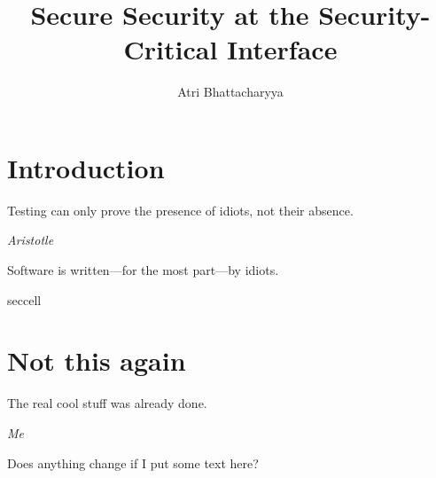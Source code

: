 \documentclass[lablogo]{thesis}
\title{Secure Security at the Security-Critical Interface}
\author{Atri Bhattacharyya}
\begin{document}
\chapter{Introduction}
\epigraph{Testing can only prove the presence of idiots, not their absence.}%
         {\textit{Aristotle}}
Software is written---for the most part---by idiots.


\begin{namedscope}{seccell}
\chapter{Not this again}
\label{ch:seccell}
\epigraph{The real cool stuff was already done.}%
        {\textit{Me}}

Does anything change if I put some text here?



\end{namedscope}



\end{document}

